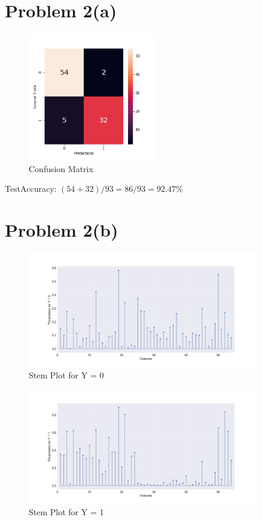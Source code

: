 \documentclass[openany,11pt]{homework}
\begin{document}
\section*{Problem 2(a)}
\begin{figure}[h]
	\centering
	\includegraphics[width= 0.5\textwidth]{2a}
	\caption{Confusion Matrix}
\end{figure}

TestAccuracy: $(54+32)/93 = 86/93 = 92.47\%$

\section*{Problem 2(b)}
\begin{figure}[!h]
	\centering
	\includegraphics[width= 0.9\textwidth]{2b1}
	\caption{Stem Plot for Y = 0}
\end{figure}

\begin{figure}[!h]
	\centering
	\includegraphics[width=0.9\textwidth]{2b2}
	\caption{Stem Plot for Y = 1}
\end{figure}
\end{document}
